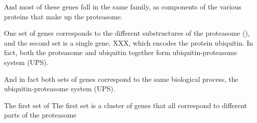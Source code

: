 \documentclass[12pt,a4paper]{article}
\begin{document}
And most of these genes fall in the same family, as components of the various proteins that make up the proteasome. 

One set of genes corresponds to the different substructures of the proteasome (), and the second set is a single gene, XXX, which encodes the protein ubiquitin. In fact, both the proteasome and ubiquitin together form ubiquitin-proteasome system (UPS).



And in fact both sets of genes correspond to the same biological process, the ubiquitin-proteasome system (UPS).

The first set of The first set is a cluster of genes that all correspond to different parts of the proteasome








\fi
\end{document}
